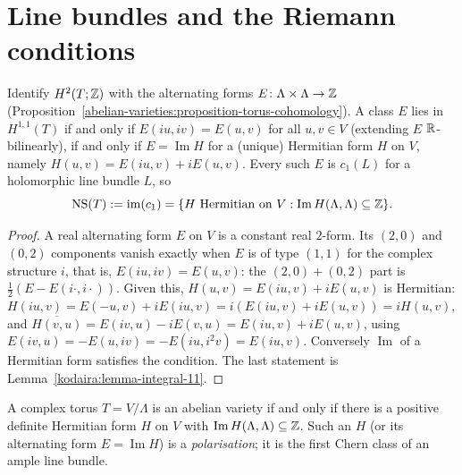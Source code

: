\section{Line bundles and the Riemann conditions}\label{abelian-varieties:section-riemann}

\begin{proposition}\label{abelian-varieties:proposition-neron-severi}
Identify $H^2(T; \mathbb{Z})$ with the alternating forms $E \colon \Lambda \times \Lambda \to \mathbb{Z}$ (Proposition~\ref{abelian-varieties:proposition-torus-cohomology}). A class $E$ lies in
$H^{1,1}(T)$ if and only if $E(iu, iv) = E(u, v)$ for all $u, v \in V$ (extending $E$ $\mathbb{R}$-bilinearly), if and only if $E = \operatorname{Im}H$ for a (unique) Hermitian form $H$ on $V$,
namely $H(u, v) = E(iu, v) + iE(u, v)$. Every such $E$ is $c_1(L)$ for a holomorphic line bundle $L$, so
\[
\mathrm{NS}(T) := \operatorname{im}(c_1) = \{H \text{ Hermitian on } V : \operatorname{Im}H(\Lambda, \Lambda) \subseteq \mathbb{Z}\}.
\]
\end{proposition}

\begin{proof}
A real alternating form $E$ on $V$ is a constant real $2$-form. Its $(2,0)$ and $(0,2)$ components vanish exactly when $E$ is of type $(1,1)$ for the complex structure $i$,
that is, $E(iu, iv) = E(u, v)$: the $(2,0) + (0,2)$ part is $\frac12(E - E(i\cdot, i\cdot))$. Given this, $H(u, v) = E(iu, v) + iE(u, v)$ is Hermitian:
$H(iu, v) = E(-u, v) + iE(iu, v) = i(E(iu, v) + iE(u, v)) = iH(u, v)$, and $\overline{H(v, u)} = E(iv, u) - iE(v, u) = E(iu, v) + iE(u, v)$, using $E(iv, u) = -E(u, iv) = -E(iu, i^2v) = E(iu, v)$.
Conversely $\operatorname{Im}$ of a Hermitian form satisfies the condition. The last statement is Lemma~\ref{kodaira:lemma-integral-11}.
\end{proof}

\begin{theorem}[Riemann]\label{abelian-varieties:theorem-riemann-conditions}
A complex torus $T = V/\Lambda$ is an abelian variety if and only if there is a positive definite Hermitian form $H$ on $V$ with $\operatorname{Im}H(\Lambda, \Lambda) \subseteq \mathbb{Z}$.
Such an $H$ (or its alternating form $E = \operatorname{Im}H$) is a \emph{polarisation}; it is the first Chern class of an ample line bundle.
\end{theorem}

